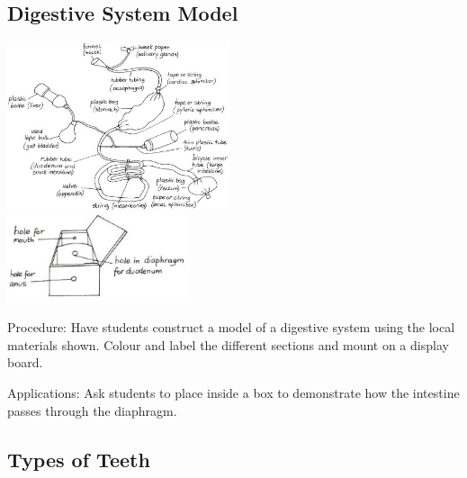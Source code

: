 \begin{multicols}{2}
\subsection{Digestive System Model} %

\begin{center}
\includegraphics[width=0.49\textwidth]{./img/vso/digestive-sys-model.jpg} \\[6pt]
\includegraphics[width=0.4\textwidth]{./img/vso/digestive-sys-model-2.jpg}
\end{center}

\begin{description*}
\item[Procedure:]{Have students construct a model of a digestive system using the local materials shown. Colour and label the different sections and mount on a display board. }
\item[Applications:]{Ask students to place inside a box to demonstrate how the intestine passes through the diaphragm.}
\end{description*}

\subsection{Types of Teeth} %


\end{multicols}
